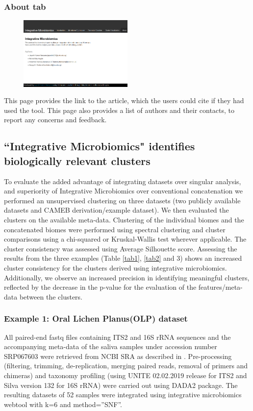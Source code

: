 \subsubsection{About tab}
\begin{figure}[H]
	\centering
\includegraphics[width=0.5\textwidth]{image/about-tab.png}
\end{figure}
This page provides the link to the article, which the users could cite if they had used the tool. This page also provides a list of authors and their contacts, to report any concerns and feedback.

\subsection{``Integrative Microbiomics" identifies biologically relevant clusters}

To evaluate the added advantage of integrating datasets over singular analysis, and superiority of Integrative Microbiomics over conventional concatenation we performed an unsupervised clustering on three datasets (two publicly available datasets and CAMEB derivation/example dataset). We then evaluated the clusters on the available meta-data. Clustering of the individual biomes and the concatenated biomes were performed using spectral clustering and cluster comparisons using a chi-squared or Kruskal-Wallis test wherever applicable. The cluster consistency was assessed using Average Silhouette score. Assessing the results from the three examples (Table \ref{tab1}, \ref{tab2} and 3) shows an increased cluster consistency for the clusters derived using integrative microbiomics. Additionally, we observe an increased precision in identifying meaningful clusters, reflected by the decrease in the p-value for the evaluation of the features/meta-data between the clusters.\\

\subsubsection{Example 1: Oral Lichen Planus(OLP) dataset}
All paired-end fastq files containing ITS2 and 16S rRNA sequences and the accompanying meta-data of the saliva samples under accession number SRP067603 were retrieved from NCBI SRA as described in \cite{Li2019}. Pre-processing (filtering, trimming, de-replication, merging paired reads, removal of primers and chimeras) and taxonomy profiling (using UNITE 02.02.2019 release for ITS2 and Silva version 132 for 16S rRNA) were carried out using DADA2 package. The resulting datasets of 52 samples were integrated using integrative microbiomics webtool with k=6 and method=”SNF”.\\

